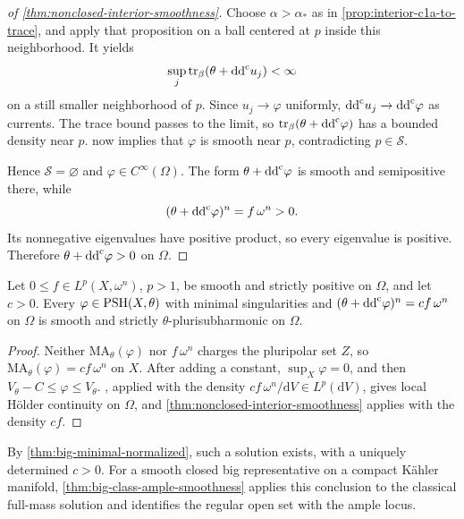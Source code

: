 \begin{proof}[of \cref{thm:nonclosed-interior-smoothness}]
Choose $\alpha>\alpha_*$ as in \cref{prop:interior-c1a-to-trace}, and apply that proposition on a ball centered at $p$ inside this neighborhood. It yields
\[
  \sup_j\operatorname{tr}_\beta(\theta+\mathrm{dd}^{\mathrm{c}} u_j)<\infty
\]
on a still smaller neighborhood of $p$. Since $u_j\to\varphi$ uniformly, $\mathrm{dd}^{\mathrm{c}} u_j\to\mathrm{dd}^{\mathrm{c}}\varphi$ as currents. The trace bound passes to the limit, so $\operatorname{tr}_\beta(\theta+\mathrm{dd}^{\mathrm{c}}\varphi)$ has a bounded density near $p$.  now implies that $\varphi$ is smooth near $p$, contradicting $p\in\mathcal S$.

Hence $\mathcal S=\varnothing$ and $\varphi\in C^\infty(\Omega)$. The form $\theta+\mathrm{dd}^{\mathrm{c}}\varphi$ is smooth and semipositive there, while
\[
  (\theta+\mathrm{dd}^{\mathrm{c}}\varphi)^n=f\,\omega^n>0.
\]
Its nonnegative eigenvalues have positive product, so every eigenvalue is positive. Therefore $\theta+\mathrm{dd}^{\mathrm{c}}\varphi>0$ on $\Omega$.
\end{proof}

\begin{corollary}\label{cor:big-lp-interior-smoothness}
Let $0\leq f\in L^p(X,\omega^n)$, $p>1$, be smooth and strictly positive
on $\Omega$, and let $c>0$. Every $\varphi\in\mathrm{PSH}(X,\theta)$ with minimal singularities and
$(\theta+\mathrm{dd}^{\mathrm{c}}\varphi)^n=cf\,\omega^n$ on $\Omega$ is smooth and strictly
$\theta$-plurisubharmonic on $\Omega$.
\end{corollary}
\begin{proof}
Neither $\mathrm{MA}_\theta(\varphi)$ nor $f\,\omega^n$ charges the pluripolar set $Z$, so $\mathrm{MA}_\theta(\varphi)=cf\,\omega^n$ on $X$. After adding a constant, $\sup_X\varphi=0$, and then $V_\theta-C\leq\varphi\leq V_\theta$. , applied with the density $cf\,\omega^n/\mathrm{d}V\in L^p(\mathrm{d}V)$, gives local H\"older continuity on $\Omega$, and \cref{thm:nonclosed-interior-smoothness} applies with the density $cf$.
\end{proof}

By \cref{thm:big-minimal-normalized}, such a solution exists, with a uniquely determined $c>0$. For a smooth closed big representative on a compact K\"ahler manifold,
\cref{thm:big-class-ample-smoothness} applies this conclusion to the
classical full-mass solution and identifies the regular open set with
the ample locus.
